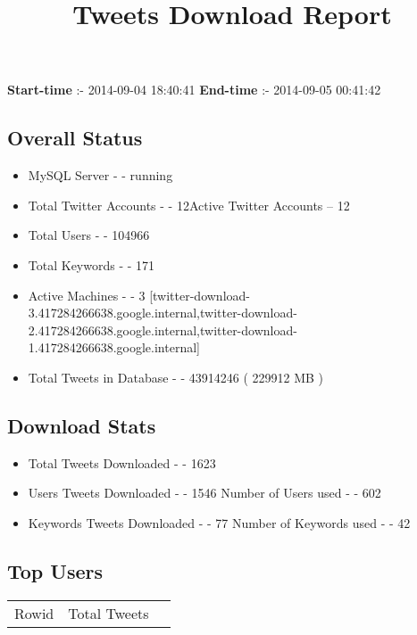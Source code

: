 \documentclass{article}\usepackage[T1]{fontenc}
\begin{document}
\title{\textbf{Tweets Download Report}}
               \date{}
                \maketitle
               \centerline{\textbf{Start-time} :- 2014-09-04 18:40:41 \hspace{40pt} \textbf{End-time} :- 2014-09-05 00:41:42}               \subsection*{Overall Status}                \begin{itemize}                \item MySQL Server - - running               \item Total Twitter Accounts - - 12\newline Active Twitter Accounts -- 12               \item Total Users - - 104966               \item Total Keywords - - 171               \item Active Machines - - 3 [twitter-download-3.417284266638.google.internal,twitter-download-2.417284266638.google.internal,twitter-download-1.417284266638.google.internal]               \item Total Tweets in Database - - 43914246 ( 229912 MB )               \end{itemize}               \subsection*{Download Stats}                \begin{itemize}                \item Total Tweets Downloaded - - 1623               \item Users Tweets Downloaded - - 1546 \newline Number of Users used - - 602               \item Keywords Tweets Downloaded - - 77 \newline Number of Keywords used - - 42              \end{itemize}              \subsection*{Top Users}\begin{tabular}{|c|c|c|}         \hline         Rowid & Total Tweets \\ 

\end{tabular}
\end{document}

